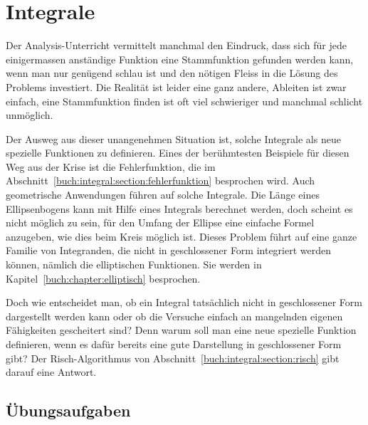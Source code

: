 %
%
%
\chapter{Integrale
\label{buch:chapter:integral}}
\rhead{}
Der Analysis-Unterricht vermittelt manchmal den Eindruck, dass sich
für jede einigermassen anständige Funktion eine Stammfunktion
gefunden werden kann, wenn man nur genügend schlau ist und den 
nötigen Fleiss in die Lösung des Problems investiert.
Die Realität ist leider eine ganz andere, Ableiten ist zwar einfach,
eine Stammfunktion finden ist oft viel schwieriger und manchmal schlicht
unmöglich.

Der Ausweg aus dieser unangenehmen Situation ist, solche Integrale
als neue spezielle Funktionen zu definieren.
Eines der berühmtesten Beispiele für diesen Weg aus der Krise ist die
Fehlerfunktion, die im Abschnitt~\ref{buch:integral:section:fehlerfunktion}
besprochen wird.
Auch geometrische Anwendungen führen auf solche Integrale.
Die Länge eines Ellipsenbogens kann mit Hilfe eines Integrals
berechnet werden, doch scheint es nicht möglich zu sein, für den
Umfang der Ellipse eine einfache Formel anzugeben, wie dies beim
Kreis möglich ist.
Dieses Problem führt auf eine ganze Familie von Integranden, die nicht in
geschlossener Form integriert werden können, nämlich die elliptischen
Funktionen.
Sie werden in Kapitel~\ref{buch:chapter:elliptisch} besprochen.

Doch wie entscheidet man, ob ein Integral tatsächlich nicht in geschlossener
Form dargestellt werden kann oder ob die Versuche einfach an mangelnden
eigenen Fähigkeiten gescheitert sind?
Denn warum soll man eine neue spezielle Funktion definieren, wenn es
dafür bereits eine gute Darstellung in geschlossener Form gibt?
Der Risch-Algorithmus von Abschnitt~\ref{buch:integral:section:risch}
gibt darauf eine Antwort.






\section*{Übungsaufgaben}
\begin{uebungsaufgaben}
\end{uebungsaufgaben}

